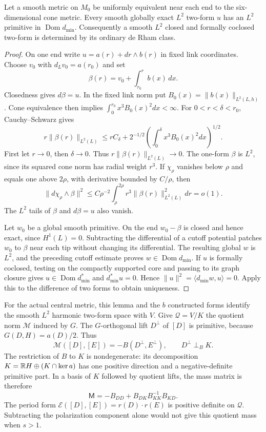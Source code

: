 \begin{lemma}\label{lem:actual-harmonic-uniqueness}
Let a smooth metric on $M_0$ be uniformly equivalent near each end to
the six-dimensional cone metric. Every smooth globally exact $L^2$
two-form $u$ has an $L^2$ primitive in $\operatorname{Dom}d_{\min}$.
Consequently a smooth $L^2$ closed and formally coclosed two-form is
determined by its ordinary de Rham class.
\end{lemma}
\begin{proof}
On one end write $u=a(r)+dr\wedge b(r)$ in fixed link coordinates.
Choose $v_0$ with $d_Lv_0=a(r_0)$ and set
\[
 \beta(r)=v_0+\int_{r_0}^r b(x)\,dx.
\]
Closedness gives $d\beta=u$. In the fixed link norm put
$B_0(x)=\|b(x)\|_{L^2(L,h)}$. Cone equivalence then implies
$\int_0^{r_0}x^3B_0(x)^2dx<\infty$.
For $0<r<\delta<r_0$, Cauchy--Schwarz gives
\[
 r\|\beta(r)\|_{L^2(L)}
 \le rC_\delta+2^{-1/2}
       \left(\int_0^\delta x^3B_0(x)^2dx\right)^{1/2}.
\]
First let $r\to0$, then $\delta\to0$. Thus
$r\|\beta(r)\|_{L^2(L)}\to0$. The one-form $\beta$ is $L^2$,
since its squared cone norm has radial weight $r^3$. If $\chi_\rho$
vanishes below $\rho$ and equals one above $2\rho$, with derivative
bounded by $C/\rho$, then
\[
 \|d\chi_\rho\wedge\beta\|^2
 \le C\rho^{-2}\int_\rho^{2\rho}
        r^3\|\beta(r)\|_{L^2(L)}^2dr=o(1).
\]
The $L^2$ tails of $\beta$ and $d\beta=u$ also vanish.

Let $w_0$ be a global smooth primitive. On the end $w_0-\beta$ is
closed and hence exact, since $H^1(L)=0$. Subtracting the differential
of a cutoff potential patches $w_0$ to $\beta$ near each tip without
changing its differential. The resulting global $w$ is $L^2$, and the
preceding cutoff estimate proves $w\in\operatorname{Dom}d_{\min}$.
If $u$ is formally coclosed, testing on the compactly supported core
and passing to its graph closure gives
$u\in\operatorname{Dom}d_{\min}^*$ and $d_{\min}^*u=0$. Hence
$\|u\|^2=\langle d_{\min}w,u\rangle=0$.
Apply this to the difference of two forms to obtain uniqueness.
\end{proof}

For the actual central metric, this lemma and the $b$ constructed forms
identify the smooth $L^2$ harmonic two-form space with $V$.
Give $\mathcal Q=V/K$ the quotient norm $\mathcal M$ induced by $G$.
The $G$-orthogonal lift $D^\perp$ of $[D]$ is primitive, because
$G(D,H)=a(D)/2$. Thus
\begin{equation}\label{eq:quotient-mass-matrix}
 \mathcal M([D],[E])=-B(D^\perp,E^\perp),\qquad
 D^\perp\perp_B K.
\end{equation}
The restriction of $B$ to $K$ is nondegenerate: its decomposition
$K=\mathbb R H\oplus(K\cap\ker a)$ has one positive direction and a
negative-definite primitive part. In a basis of $K$ followed by
quotient lifts, the mass matrix is therefore
\begin{equation}\label{eq:mass-schur}
 \mathsf M=-B_{DD}+B_{DK}B_{KK}^{-1}B_{KD}.
\end{equation}
The period form
$\mathcal E([D],[E])=r(D)\cdot r(E)$ is positive definite on $\mathcal Q$.
Subtracting the polarization component alone would not give this
quotient mass when $s>1$.

